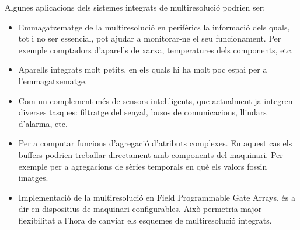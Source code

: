 


Algunes aplicacions dels sistemes integrats de multiresolució podrien ser:

\begin{itemize}
\item Emmagatzematge de la multiresolució en perifèrics la informació
  dels quals, tot i no ser essencial,  pot ajudar a monitorar-ne el seu
  funcionament. Per exemple comptadors d'aparells de xarxa,
  temperatures dels components, etc.

\item Aparells integrats molt petits, en els quals hi ha molt poc
  espai per a l'emmagatzematge. %

\item Com un complement més de sensors inte\l.ligents, que actualment
  ja integren diverses tasques: filtratge del senyal, busos de
  comunicacions, llindars d'alarma, etc.


\item Per a computar funcions d'agregació d'atributs complexes. En
  aquest cas els buffers podrien treballar directament amb components
  del maquinari. Per exemple per a agregacions de sèries temporals en
  què els valors fossin imatges.

\item Implementació de la multiresolució en Field Programmable Gate
  Arrays, és a dir en dispositius de maquinari configurables. Això
  permetria major flexibilitat a l'hora de canviar els esquemes de
  multiresolució integrats.



\end{itemize}











